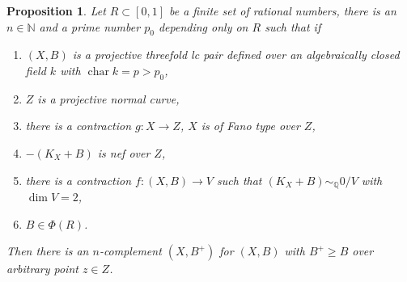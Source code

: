 \documentclass[letterpaper,reqno,12pt]{amsart}
\DeclareMathOperator{\chara}{char}
\numberwithin{equation}{section}
\theoremstyle{plain}
\newtheorem{proposition}[theorem]{Proposition}
\begin{document}
\begin{proposition}
\label{relacomp2}
    Let $R\subset [0,1]$ be a finite set of rational numbers, there is an $n\in\mathbb N$ and a prime number $p_0$ depending only on $R$ such that if 
    \begin{enumerate}
        \item $(X,B)$ is a projective threefold lc pair defined over an algebraically closed field $k$ with $\chara k=p>p_0$,
        \item $Z$ is a projective normal curve,
        \item there is a contraction $g:X\to Z$, $X$ is of Fano type over $Z$,
        \item $-(K_X+B)$ is nef over $Z$,
        \item there is a contraction $f:(X,B)\to V$ such that $(K_X+B)\sim_{\mathbb Q} 0/V$ with $\dim V=2$,
        \item $B\in\Phi(R)$.
    \end{enumerate} 
    Then there is an $n$-complement $(X,B^+)$ for $(X,B)$ with $B^+\geq B$ over arbitrary point $z\in Z$.
\end{proposition}
\end{document}
